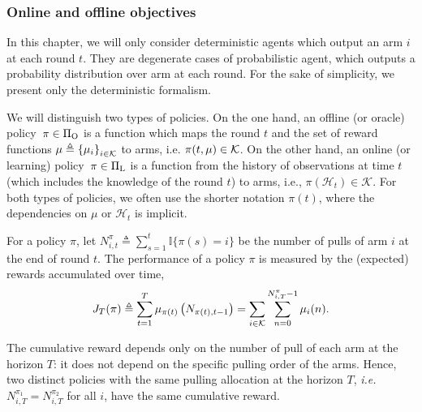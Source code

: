 


%
\subsubsection*{Online and offline objectives}
In this chapter, we will only consider deterministic agents which output an arm $i$ at each round $t$. They are degenerate cases of probabilistic agent, which outputs a probability distribution over arm at each round. For the sake of simplicity, we present only the deterministic formalism.   

We will distinguish two types of policies. On the one hand, an offline (or oracle) policy~$\pi \in \Pi_{\rm O}$ is a function which maps the round $t$ and the set of reward functions $\mathbb{\mu} \triangleq \left\{ \mu_i \right\}_{i \in \mathcal{K}}$ to arms, i.e. $\pi(t, \mathbb{\mu}) \in \mathcal{K}$.  On the other hand, an online (or learning) policy~$\pi \in \Pi_{\rm L}$ is a function from the history of observations at time $t$ (which includes the knowledge of the round $t$) to arms, i.e., $\pi(\mathcal{H}_t) \in \mathcal{K}$. For both types of policies, we often use the shorter notation $\pi(t)$, where the dependencies on $\mu$ or $\mathcal{H}_t$ is implicit. 

For a policy $\pi$, let $N_{i,t}^\pi \triangleq \sum_{s=1}^{t} \mathbb{I}\{\pi(s) = i\}$ be the number of pulls of arm $i$ at the end of round $t$. The performance of a policy $\pi$ is measured by the (expected) rewards accumulated over time, 
%
\begin{equation}
\label{eq:cumul-reward}
J_T(\pi) \triangleq \sum_{t=1}^T \mu_{\pi(t)}\left(N_{\pi(t),t-1}\right) = \sum_{i \in \mathcal{K}} \sum_{n=0}^{N_{i,T}^\pi-1} \mu_i(n).
\end{equation}
\begin{remark}
\label{rem:pull-allocation}
The cumulative reward depends only on the number of pull of each arm at the horizon $T$: it does not depend on the specific pulling order of the arms. Hence, two distinct policies with the same pulling allocation at the horizon $T$, \emph{i.e.} $N_{i,T}^{\pi_1} = N_{i,T}^{\pi_2}$ for all $i$, have the same cumulative reward.
\end{remark}

